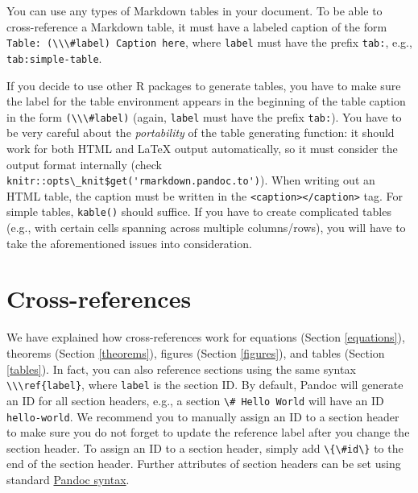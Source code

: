 \documentclass[doctor,openright,twoside]{sjtuthesis}
\newcommand{\passthrough}[1]{#1}
\theoremstyle{plain}
\theoremstyle{definition}
\theoremstyle{remark}
\theoremstyle{ocrenumbox}
\theoremstyle{plain}
\begin{document}
You can use any types of Markdown tables in your document. To be able to cross-reference a Markdown table, it must have a labeled caption of the form \passthrough{\lstinline!Table: (\\\#label) Caption here!}, where \passthrough{\lstinline!label!} must have the prefix \passthrough{\lstinline!tab:!}, e.g., \passthrough{\lstinline!tab:simple-table!}.

If you decide to use other R packages to generate tables, you have to make sure the label for the table environment appears in the beginning of the table caption in the form \passthrough{\lstinline!(\\\#label)!} (again, \passthrough{\lstinline!label!} must have the prefix \passthrough{\lstinline!tab:!}). You have to be very careful about the \emph{portability} of the table generating function: it should work for both HTML and LaTeX output automatically, so it must consider the output format internally (check \passthrough{\lstinline!knitr::opts\_knit$get('rmarkdown.pandoc.to')!}). When writing out an HTML table, the caption must be written in the \passthrough{\lstinline!<caption></caption>!} tag. For simple tables, \passthrough{\lstinline!kable()!} should suffice. If you have to create complicated tables (e.g., with certain cells spanning across multiple columns/rows), you will have to take the aforementioned issues into consideration.

\hypertarget{cross-references}{%
\section{Cross-references}\label{cross-references}}

We have explained how cross-references work for equations (Section \ref{equations}), theorems (Section \ref{theorems}), figures (Section \ref{figures}), and tables (Section \ref{tables}). In fact, you can also reference sections using the same syntax \passthrough{\lstinline!\\\ref{label}!}, where \passthrough{\lstinline!label!} is the section ID. By default, Pandoc will generate an ID for all section headers, e.g., a section \passthrough{\lstinline!\# Hello World!} will have an ID \passthrough{\lstinline!hello-world!}. We recommend you to manually assign an ID to a section header to make sure you do not forget to update the reference label after you change the section header. To assign an ID to a section header, simply add \passthrough{\lstinline!\{\#id\}!} to the end of the section header. Further attributes of section headers can be set using standard \href{http://pandoc.org/MANUAL.html\#header-identifiers}{Pandoc syntax}.
\end{document}
